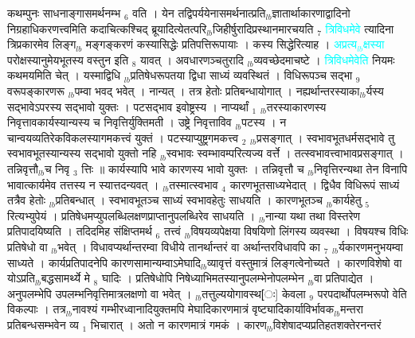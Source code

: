 \documentclass[article,12pt,a4paper]{memoir}%
\newcommand{\quotelemma}[1]{\textcolor{cyan}{#1}}
\begin{document}
	  
	  \pstart \leavevmode%
	कथम्पुनः साधनाङ्गासमर्थनम्भ {\tiny $_{6}$} वति । येन तद्विपर्ययेनासमर्थनात्प्रति{\tiny $_{lb}$}ज्ञातार्थाकारणाद्वादिनो निग्रहाधिकरणत्त्वमिति कदाचित्कश्चिद् ब्रूयादित्येतत्परि{\tiny $_{lb}$}जिहीर्षुरादिप्रस्थानमारचयति {\tiny $_{7}$} \quotelemma{त्रिविधमेवे} \cite[1b2]{vn-msN} त्यादिना त्रिप्रकारमेव लिङ्ग{\tiny $_{lb}$} \leavevmode{} मङ्गङ्करणं कस्यासिद्धेः प्रतिपत्तिरूपायाः । कस्य सिद्धेरित्याह । \quotelemma{अप्रत्य{\tiny $_{lb}$}क्षस्या} परोक्षस्यानुमेयभूतस्य वस्तुन इति {\tiny $_{8}$} यावत् । अवधारणञ्चतुरादि {\tiny $_{lb}$}व्यवच्छेदमाचष्टे । \quotelemma{त्रिविधमेवेति} नियमः कथमयमिति चेत् । यस्माद्विधि {\tiny $_{lb}$}प्रतिषेधरूपतया द्विधा साध्यं व्यवस्थितं । विधिरूपञ्च सद्भा {\tiny $_{9}$} \leavevmode{} वरूपङ्कारणरू {\tiny $_{lb}$}पम्वा भवद् भवेत् । नान्यत् । तत्र हेतोः प्रतिबन्धायोगात् । नह्यर्थान्तरस्याका{\tiny $_{lb}$}र्यस्य सद्भावेऽपरस्य सद्भावो युक्तः । पटसद्भाव इवोष्ट्रस्य । नाप्यर्थां {\tiny $_{1}$} {\tiny $_{lb}$}तरस्याकारणस्य निवृत्तावकार्यस्यान्यस्य च निवृत्तिर्युक्तिमती । उष्ट्रे निवृत्ताविव {\tiny $_{lb}$}पटस्य । न चान्वयव्यतिरेकविकलस्यागमकत्त्वं युक्तं । पटस्याप्युष्ट्रगमकत्त्व {\tiny $_{2}$} {\tiny $_{lb}$}प्रसङ्गात् । स्वभावभूतधर्मसद्भावे तु स्वभावभूतस्यान्यस्य सद्भावो युक्तो नहि {\tiny $_{lb}$}स्वभावः स्वम्भावम्परित्यज्य वर्त्ते । तत्स्वभावत्त्वाभावप्रसङ्गात् । तन्निवृत्तौ{\tiny $_{lb}$}च निवृ {\tiny $_{3}$} त्तिः ॥ कार्यस्यापि भावे कारणस्य भावो युक्तः । तन्निवृत्तौ च {\tiny $_{lb}$}निवृत्तिरन्यथा तेन विनापि भावात्कार्यमेव तत्तस्य न स्यात्तदन्यवत् । {\tiny $_{lb}$}तस्मात्स्वभाव {\tiny $_{4}$} कारणभूतसाध्यभेदात् । द्विधैव विधिरूपं साध्यं तत्रैव हेतोः {\tiny $_{lb}$}प्रतिबन्धात् । स्वभावभूतञ्च साध्यं स्वभावहेतुः साधयति । कारणभूतञ्च {\tiny $_{lb}$}कार्यहेतु {\tiny $_{5}$} रित्यभ्युपेयं । प्रतिषेधमप्युपलब्धिलक्षणप्राप्तानुपलब्धिरेव साधयति । {\tiny $_{lb}$}नान्या यथा तथा विस्तरेण प्रतिपादयिष्यति । तदिदमिह संक्षिप्तमर्थ {\tiny $_{6}$} तत्त्वं {\tiny $_{lb}$}विषयव्यपेक्षया विषयिणो लिंगस्य व्यवस्था । विषयश्च विधिः प्रतिषेधो वा {\tiny $_{lb}$}भवेत् । विधावप्यर्थान्तरम्वा विधीये तानर्थान्तरं वा अर्थान्तरविधावपि का {\tiny $_{7}$} {\tiny $_{lb}$}र्यकारणमनुभयम्वा साध्यते । कार्यप्रतिपादनेपि कारणसामान्यम्वाऽमेघादि{\tiny $_{lb}$}व्यावृत्तं वस्तुमात्रं लिङ्गत्वेनोच्यते । कारणविशेषो वा योऽप्रति{\tiny $_{lb}$}बद्धसामर्थ्ये मे {\tiny $_{8}$} घादिः । प्रतिषेधोपि निषेध्याभिमतस्यानुपलम्भेनोपलम्भेन {\tiny $_{lb}$}वा प्रतिपाद्येत । अनुपलम्भेपि उपलम्भनिवृत्तिमात्रलक्षणो वा भवेत् । {\tiny $_{lb}$}तत्तुल्ययोगावस्थ[ः] केवला {\tiny $_{9}$}\leavevmode{} परपदार्थोपलम्भरूपो वेति विकल्पाः । तत्र{\tiny $_{lb}$}नावश्यं गम्भीरध्वानादियुक्तमपि मेघादिकारणमात्रं वृष्ट्यादिकार्याविर्भावक{\tiny $_{lb}$}मन्तरा प्रतिबन्धसम्भवेन व्य {\tiny $_{1}$} भिचारात् । अतो न कारणमात्रं गमकं । कारण{\tiny $_{lb}$}विशेषादप्यप्रतिहतशक्तेरनन्तरं 
\end{document}
